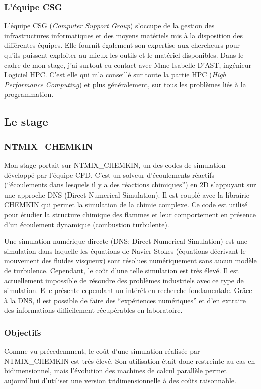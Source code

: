 \subsubsection{L'équipe CSG}
L'équipe CSG (\textit{Computer Support Group}) s'occupe de la gestion des infrastructures informatiques et des moyens matériels mis à la disposition des différentes équipes. Elle fournit également son expertise aux chercheurs pour qu'ils puissent exploiter au mieux les outils et le matériel disponibles.
Dans le cadre de mon stage, j'ai surtout eu contact avec Mme Isabelle D'AST, ingénieur Logiciel HPC. C'est elle qui m'a conseillé sur toute la partie HPC (\textit{High Performance Computing}) et plus généralement, sur tous les problèmes liés à la programmation.

\subsection{Le stage}
\subsubsection{NTMIX\_CHEMKIN}
Mon stage portait sur NTMIX\_CHEMKIN, un des codes de simulation développé par l'équipe CFD. C'est un solveur d'écoulements réactifs (``écoulements dans lesquels il y a des réactions chimiques'') en 2D s'appuyant sur une approche DNS (Direct Numerical Simulation). Il est couplé avec la librairie CHEMKIN qui permet la simulation de la chimie complexe. Ce code est utilisé pour étudier la structure chimique des flammes et leur comportement en présence d'un écoulement dynamique (combustion turbulente).\cite{cerfacs}



Une simulation numérique directe (DNS: Direct Numerical Simulation) est une simulation dans laquelle les équations de Navier-Stokes (équations décrivant le mouvement des fluides visqueux) sont résolues numériquement sans aucun modèle de turbulence. Cependant, le coût d'une telle simulation est très élevé. Il est actuellement impossible de résoudre des problèmes industriels avec ce type de simulation. Elle présente cependant un intérêt en recherche fondamentale. Grâce à la DNS, il est possible de faire des ``expériences numériques'' et d'en extraire des informations difficilement récupérables en laboratoire.\cite{cfd-online-DNS}


\subsubsection{Objectifs}
Comme vu précedemment, le coût d'une simulation réalisée par NTMIX\_CHEMKIN est très élevé. Son utilisation était donc restreinte au cas en bidimensionnel, mais l'évolution des machines de calcul parallèle permet aujourd'hui d'utiliser une version tridimensionnelle à des coûts raisonnable.


